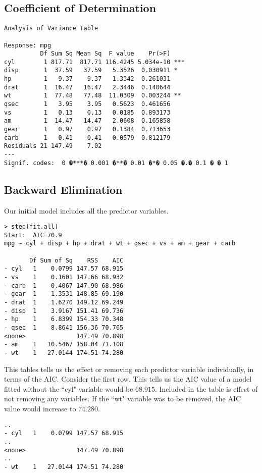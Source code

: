 \documentclass[a4paper,12pt]{article}
\begin{document}
\newpage


\subsection{Coefficient of Determination}


\begin{verbatim}
Analysis of Variance Table

Response: mpg
          Df Sum Sq Mean Sq  F value    Pr(>F)
cyl        1 817.71  817.71 116.4245 5.034e-10 ***
disp       1  37.59   37.59   5.3526  0.030911 *
hp         1   9.37    9.37   1.3342  0.261031
drat       1  16.47   16.47   2.3446  0.140644
wt         1  77.48   77.48  11.0309  0.003244 **
qsec       1   3.95    3.95   0.5623  0.461656
vs         1   0.13    0.13   0.0185  0.893173
am         1  14.47   14.47   2.0608  0.165858
gear       1   0.97    0.97   0.1384  0.713653
carb       1   0.41    0.41   0.0579  0.812179
Residuals 21 147.49    7.02
---
Signif. codes:  0 �***� 0.001 �**� 0.01 �*� 0.05 �.� 0.1 � � 1
\end{verbatim}


\newpage
\subsection{Backward Elimination}
Our initial model includes all the predictor variables.
\begin{verbatim}
> step(fit.all)
Start:  AIC=70.9
mpg ~ cyl + disp + hp + drat + wt + qsec + vs + am + gear + carb

       Df Sum of Sq    RSS    AIC
- cyl   1    0.0799 147.57 68.915
- vs    1    0.1601 147.66 68.932
- carb  1    0.4067 147.90 68.986
- gear  1    1.3531 148.85 69.190
- drat  1    1.6270 149.12 69.249
- disp  1    3.9167 151.41 69.736
- hp    1    6.8399 154.33 70.348
- qsec  1    8.8641 156.36 70.765
<none>              147.49 70.898
- am    1   10.5467 158.04 71.108
- wt    1   27.0144 174.51 74.280
\end{verbatim}

This tables tells us the effect or removing each predictor variable individually, in terms of the AIC.
Consider the first row. This tells us the AIC value of a model fitted without the ``cyl" variable would be $68.915$.
Included in the table is effect of not removing any variables. If the ``wt" variable was to be removed, the AIC value would increase to $74.280$.
\begin{verbatim}
..
- cyl   1    0.0799 147.57 68.915
..
<none>              147.49 70.898
..
- wt    1   27.0144 174.51 74.280
\end{verbatim}
\end{document}
